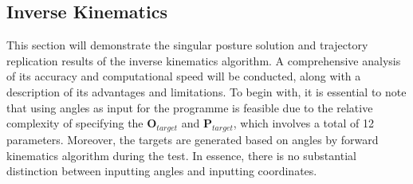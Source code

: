 \subsection{Inverse Kinematics}
This section will demonstrate the singular posture solution and trajectory replication results of the inverse 
kinematics algorithm. A comprehensive analysis of its accuracy and computational speed will be conducted, along 
with a description of its advantages and limitations. To begin with, it is essential to note that using angles 
as input for the programme is feasible due to the relative complexity of specifying the $\textbf{O}_{target}$ 
and $\textbf{P}_{target}$, which involves a total of 12 parameters. Moreover, the targets are generated based 
on angles by forward kinematics algorithm during the test. In essence, there is no substantial distinction 
between inputting angles and inputting coordinates.
